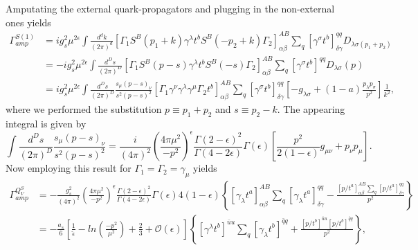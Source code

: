 	Amputating the external quark-propagators and plugging in the non-external ones yields
	\begin{equation}	
		\begin{split}
			\Gamma^{S(1)}_{amp} &= i g^2_s \mu^{2\epsilon} \int \frac{d^dk}{(2\pi)^d} [\Gamma_1 S^B(p_1+k) \gamma^\lambda t^b S^B(-p_2+k) \Gamma_2]^{AB}_{\alpha\beta} \sum_q [\gamma^\sigma t^b]^{q q}_{\delta\gamma} D_{\lambda \sigma (p_1 + p_2)} \\
			 &= - ig^2_s \mu^{2 \epsilon} \int \frac{d^D s}{(2 \pi)^D} [\Gamma_1 S^B(p-s) \gamma^\lambda t^b S^{B}(-s) \Gamma_2 ]^{AB}_{\alpha\beta} \sum_q [\gamma^\sigma t^b ]^{q q} D_{\lambda\sigma}(p) \\
			&= i g^2_s \mu^{2\epsilon} \int \frac{d^Ds}{(2\pi)^D} \frac{s_\mu (p-s)_\nu}{s^2 (p-s)^2} [\Gamma_1 \gamma^\nu \gamma^\lambda \gamma^\mu \Gamma_2 t^b]^{AB}_{\alpha\beta} \sum_q [ \gamma^\sigma t^b ]^{q q}_{\delta\gamma} [-g_{\lambda\sigma} + (1-a) \frac{p_\lambda p_\sigma}{p^2}]\frac{1}{k^2}, 
		\end{split}
	\end{equation}
	where we performed the substitution $p\equiv p_1+p_2$ and $s\equiv p_2 -k$. The appearing integral is given by 
	\begin{equation}
		\int \frac{d^Ds}{(2\pi)^D} \frac{s_\mu (p-s)_\nu}{s^2(p-s)^2} = \frac{i}{(4\pi)^2} \left(\frac{4\pi \mu^2}{-p^2}\right)^\epsilon \frac{\Gamma(2-\epsilon)^2}{\Gamma(4-2\epsilon)} \Gamma(\epsilon) \left[\frac{p^2}{2(1-\epsilon)}g_{\mu\nu} + p_\nu p_\mu \right].
	\end{equation}
	Now employing this result for $\Gamma_1 = \Gamma_2 = \gamma_\mu$ yields 
	\begin{equation}
		\begin{split}
			\label{eq:penguin1Contraction}
			\Gamma^{Q^S_V}_{amp} &= -\frac{g^2_s}{(4\pi)^2} \left(\frac{4\pi \mu^2}{-p^2}\right)^\epsilon \frac{\Gamma(2-\epsilon)^2}{\Gamma(4-2\epsilon)} \Gamma(\epsilon) 4(1-\epsilon) \left\{ [ \gamma_\lambda t^a ]^{AB}_{\alpha\beta} \sum_q [ \gamma_\lambda t^a ]^{qq}_{\delta\gamma} - \frac{[p\!\!\!/ t^a]^{AB}_{\alpha\beta} \sum_q [p\!\!\!/ t^a]^{qq}_{\delta\gamma}}{p^2}\right\} \\
			&= -\frac{a_s}{6} \left[\frac{1}{\hat \epsilon} - ln \left(\frac{-p^2}{\mu^2}\right) + \frac{2}{3} + \mathcal{O}(\epsilon) \right] \left\{ \left[ \gamma^\lambda t^b \right]^{\bar uu} \sum_q \left[ \gamma_\lambda t^b \right]^{\bar qq} + \frac{\left[p\!\!\!/ t^b\right]^{\bar uu} \left[p\!\!\!/ t^b\right]^{\bar qq}}{p^2}\right\},
		\end{split}
	\end{equation}
